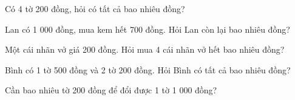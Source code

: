 \begin{ex} %
Có 4 tờ 200 đồng, hỏi có tất cả bao nhiêu đồng?
\end{ex}

\begin{ex} %
Lan có 1 000 đồng, mua kem hết 700 đồng. Hỏi Lan còn lại bao nhiêu đồng?
\end{ex}

\begin{ex} %
Một cái nhãn vở giá 200 đồng. Hỏi mua 4 cái nhãn vở hết bao nhiêu đồng?
\end{ex}

\begin{ex} %
Bình có 1 tờ 500 đồng và 2 tờ 200 đồng. Hỏi Bình có tất cả bao nhiêu đồng?
\end{ex}

\begin{ex} %
Cần bao nhiêu tờ 200 đồng để đổi được 1 tờ 1 000 đồng?
\end{ex}
